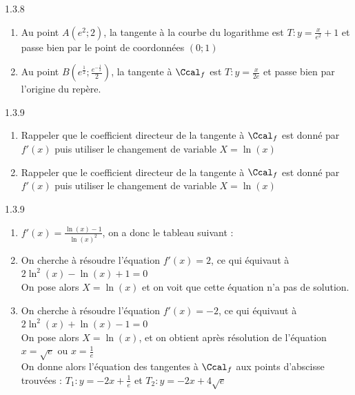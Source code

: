\begin{Solution}{1.3.8}
	\begin{enumerate}
		\item Au point $A\left(e^2;2\right)$, la tangente à la courbe du logarithme est $T:y=\frac{x}{e^2}+1$ et passe bien par le point de coordonnées $(0;1)$
		\item Au point $B\left(e^{\frac{1}{2}};\frac{e^{-\frac{1}{2}}}{2}\right)$, la tangente à $\Ccal_f$ est $T:y=\frac{x}{2e}$ et passe bien par l'origine du repère.
	\end{enumerate}
\end{Solution}
\begin{Indication}{1.3.9}
	\begin{enumerate}
		\item[3.] Rappeler que le coefficient directeur de la tangente à $\Ccal_f$ est donné par $f'(x)$ puis utiliser le changement de variable $X=\ln(x)$
		\item[4.] Rappeler que le coefficient directeur de la tangente à $\Ccal_f$ est donné par $f'(x)$ puis utiliser le changement de variable $X=\ln(x)$
	\end{enumerate}
\end{Indication}
\begin{Solution}{1.3.9}
	\begin{enumerate}
		\item[2.] $f'(x)=\frac{\ln(x)-1}{\ln(x)^2}$, on a donc le tableau suivant :\\
		\item[3.] On cherche à résoudre l'équation $f'(x)=2$, ce qui équivaut à $2\ln^2(x)-\ln(x)+1=0$\\
		On pose alors $X=\ln(x)$ et on voit que cette équation n'a pas de solution.
		\item[4.] On cherche à résoudre l'équation $f'(x)=-2$, ce qui équivaut à $2\ln^2(x)+\ln(x)-1=0$\\
		On pose alors $X=\ln(x)$, et on obtient après résolution de l'équation $x=\sqrt{e}$ ou $x=\frac{1}{e}$\\
		On donne alors l'équation des tangentes à $\Ccal_f$ aux points d'abscisse trouvées : $T_1:y=-2x+\frac{1}{e}$ et $T_2:y=-2x+4\sqrt{e}$
	\end{enumerate}
\end{Solution}
